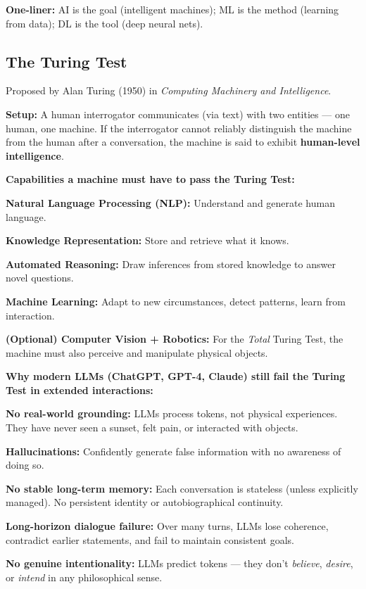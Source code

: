 \documentclass[12pt, a4paper]{article}
\begin{document}
\noindent \textbf{One-liner:} AI is the goal (intelligent machines); ML is the method (learning from data); DL is the tool (deep neural nets).

\subsection{The Turing Test}

\noindent Proposed by Alan Turing (1950) in \textit{Computing Machinery and Intelligence}.

\vspace{0.3em}
\noindent\textbf{Setup:} A human interrogator communicates (via text) with two entities — one human, one machine. If the interrogator cannot reliably distinguish the machine from the human after a conversation, the machine is said to exhibit \textbf{human-level intelligence}.

\vspace{0.4em}
\noindent\textbf{Capabilities a machine must have to pass the Turing Test:}
\begin{keypoints}
  \item \textbf{Natural Language Processing (NLP):} Understand and generate human language.
  \item \textbf{Knowledge Representation:} Store and retrieve what it knows.
  \item \textbf{Automated Reasoning:} Draw inferences from stored knowledge to answer novel questions.
  \item \textbf{Machine Learning:} Adapt to new circumstances, detect patterns, learn from interaction.
  \item \textbf{(Optional) Computer Vision + Robotics:} For the \emph{Total} Turing Test, the machine must also perceive and manipulate physical objects.
\end{keypoints}

\vspace{0.4em}
\noindent\textbf{Why modern LLMs (ChatGPT, GPT-4, Claude) still fail the Turing Test in extended interactions:}
\begin{keypoints}
  \item \textbf{No real-world grounding:} LLMs process tokens, not physical experiences. They have never seen a sunset, felt pain, or interacted with objects.
  \item \textbf{Hallucinations:} Confidently generate false information with no awareness of doing so.
  \item \textbf{No stable long-term memory:} Each conversation is stateless (unless explicitly managed). No persistent identity or autobiographical continuity.
  \item \textbf{Long-horizon dialogue failure:} Over many turns, LLMs lose coherence, contradict earlier statements, and fail to maintain consistent goals.
  \item \textbf{No genuine intentionality:} LLMs predict tokens — they don't \emph{believe}, \emph{desire}, or \emph{intend} in any philosophical sense.
\end{keypoints}
\end{document}

